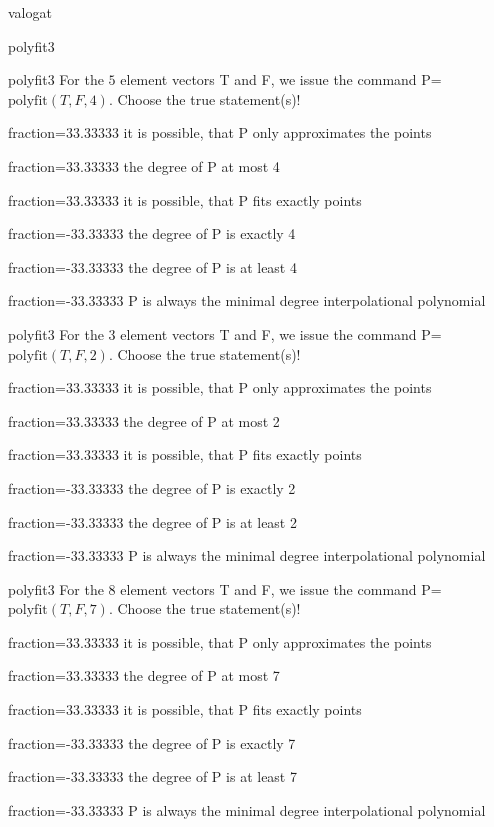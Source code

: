 \documentclass[12pt]{article}
\begin{document}
\begin{quiz}{valogat}
\begin{multi}[single=false]{polyfit3}
\end{multi}
\begin{multi}[single=false]{polyfit3}
For the $5$ element vectors T and F, we issue the command P=$\mathrm{polyfit}(T,F,4)$.
Choose the true statement(s)!
\item[fraction=33.33333] it is possible, that P only approximates the points
\item[fraction=33.33333] the degree of P at most 4
\item[fraction=33.33333] it is possible, that P fits exactly points
\item[fraction=-33.33333]  the degree of P is exactly 4
\item[fraction=-33.33333]  the degree of P is at least 4
\item[fraction=-33.33333]  P is always the minimal degree interpolational polynomial
\end{multi}
\begin{multi}[single=false]{polyfit3}
For the $3$ element vectors T and F, we issue the command P=$\mathrm{polyfit}(T,F,2)$.
Choose the true statement(s)!
\item[fraction=33.33333] it is possible, that P only approximates the points
\item[fraction=33.33333] the degree of P at most 2
\item[fraction=33.33333] it is possible, that P fits exactly points
\item[fraction=-33.33333]  the degree of P is exactly 2
\item[fraction=-33.33333]  the degree of P is at least 2
\item[fraction=-33.33333]  P is always the minimal degree interpolational polynomial
\end{multi}
\begin{multi}[single=false]{polyfit3}
For the $8$ element vectors T and F, we issue the command P=$\mathrm{polyfit}(T,F,7)$.
Choose the true statement(s)!
\item[fraction=33.33333] it is possible, that P only approximates the points
\item[fraction=33.33333] the degree of P at most 7
\item[fraction=33.33333] it is possible, that P fits exactly points
\item[fraction=-33.33333]  the degree of P is exactly 7
\item[fraction=-33.33333]  the degree of P is at least 7
\item[fraction=-33.33333]  P is always the minimal degree interpolational polynomial

\end{multi}
\end{quiz}
\end{document}
